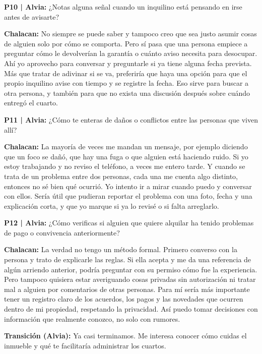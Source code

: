 \documentclass[11pt,a4paper]{article}
\newcommand{\habla}[2]{
    \par\noindent\hspace*{0.8em}\textbf{#1:} #2\par
}
\newcommand{\pregunta}[2]{
    \par\noindent\textbf{P#1 | Alvia:} #2\par
}
\begin{document}
\pregunta{10}{
¿Notas alguna señal cuando un inquilino está pensando en irse antes de avisarte?
}

\habla{Chalacan}{
No siempre se puede saber y tampoco creo que sea justo asumir cosas de alguien solo por cómo se comporta. Pero sí pasa que una persona empiece a preguntar cómo le devolverían la garantía o cuánto aviso necesita para desocupar. Ahí yo aprovecho para conversar y preguntarle si ya tiene alguna fecha prevista. Más que tratar de adivinar si se va, preferiría que haya una opción para que el propio inquilino avise con tiempo y se registre la fecha. Eso sirve para buscar a otra persona, y también para que no exista una discusión después sobre cuándo entregó el cuarto.
}


\pregunta{11}{
¿Cómo te enteras de daños o conflictos entre las personas que viven allí?
}

\habla{Chalacan}{
La mayoría de veces me mandan un mensaje, por ejemplo diciendo que un foco se dañó, que hay una fuga o que alguien está haciendo ruido. Si yo estoy trabajando y no reviso el teléfono, a veces me entero tarde. Y cuando se trata de un problema entre dos personas, cada una me cuenta algo distinto, entonces no sé bien qué ocurrió. Yo intento ir a mirar cuando puedo y conversar con ellos. Sería útil que pudieran reportar el problema con una foto, fecha y una explicación corta, y que yo marque si ya lo revisé o si falta arreglarlo.
}


\pregunta{12}{
¿Cómo verificas si alguien que quiere alquilar ha tenido problemas de pago o convivencia anteriormente?
}

\habla{Chalacan}{
La verdad no tengo un método formal. Primero converso con la persona y trato de explicarle las reglas. Si ella acepta y me da una referencia de algún arriendo anterior, podría preguntar con su permiso cómo fue la experiencia. Pero tampoco quisiera estar averiguando cosas privadas sin autorización ni tratar mal a alguien por comentarios de otras personas. Para mí sería más importante tener un registro claro de los acuerdos, los pagos y las novedades que ocurren dentro de mi propiedad, respetando la privacidad. Así puedo tomar decisiones con información que realmente conozco, no solo con rumores.
}

\par\noindent
\textbf{Transición (Alvia):}
Ya casi terminamos. Me interesa conocer cómo cuidas el inmueble y qué te facilitaría administrar los cuartos.


\end{document}
